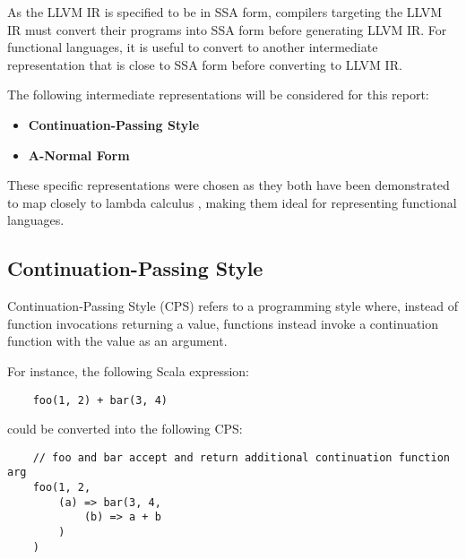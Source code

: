 As the LLVM IR is specified to be in SSA form, compilers targeting the LLVM IR must convert their
programs into SSA form before generating LLVM IR. For functional languages, it is useful to convert
to another intermediate representation that is close to SSA form before converting to LLVM IR.

The following intermediate representations will be considered for this report:
\begin{itemize}
    \onehalfspacing
    \item \textbf{Continuation-Passing Style}
    \item \textbf{A-Normal Form}
\end{itemize}

These specific representations were chosen as they both have been demonstrated to map closely to
lambda calculus \autocite{morrisett1999systemf,flanagan1993essence}, making them ideal for
representing functional languages.

\subsection{Continuation-Passing Style}
\label{sec:cps}

Continuation-Passing Style (CPS) refers to a programming style where, instead of function
invocations returning a value, functions instead invoke a continuation function with the value as
an argument.


For instance, the following Scala expression:

\begin{verbatim}
    foo(1, 2) + bar(3, 4)
\end{verbatim}

\noindent could be converted into the following CPS:

\begin{verbatim}
    // foo and bar accept and return additional continuation function arg
    foo(1, 2,
        (a) => bar(3, 4,
            (b) => a + b
        )
    )
\end{verbatim}

